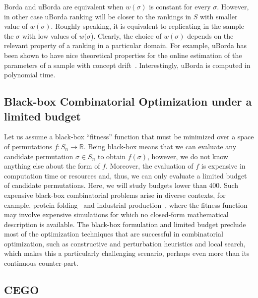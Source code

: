 \documentclass[runningheads]{llncs}
\begin{document}
Borda and uBorda are equivalent when $w(\sigma)$ is constant for every $\sigma$. However, in other case uBorda ranking will be closer to the rankings in $S$ with smaller value of $w(\sigma)$. Roughly speaking, it is equivalent to replicating in the sample the $\sigma$ with low values of $w(\sigma$).
Clearly, the choice of  $w(\sigma)$ depends on the relevant property of a ranking in a particular domain. For example, uBorda has been shown to have nice theoretical properties for the online estimation of the parameters of a sample with concept drift~\cite{???}. 
%
Interestingly, uBorda is computed in polynomial time.



\subsection{Black-box Combinatorial Optimization under a limited budget}

Let us assume a black-box ``fitness'' function that must be minimized over a
space of permutations $f\colon S_n \to \mathbb{R}$. Being black-box means that
we can evaluate any candidate permutation $\sigma \in S_n$ to obtain
$f(\sigma)$, however, we do not know anything else about the form of
$f$. Moreover, the evaluation of $f$ is expensive in computation time or
resources and, thus, we can only evaluate a limited budget of candidate
permutations. Here, we will study budgets lower than 400. Such expensive
black-box combinatorial problems arise in diverse contexts, for example,
protein folding~\citep{RomKraArn2012protein} and industrial
production~\citep{FerAlvDiaIglEna2014ants}, where the fitness function may
involve expensive simulations for which no closed-form mathematical description
is available. The black-box formulation and limited budget preclude most of the
optimization techniques that are successful in combinatorial optimization, such
as constructive and perturbation heuristics and local search, which makes this
a particularly challenging scenario, perhaps even more than its continuous
counter-part.

\subsection{CEGO}
\end{document}
